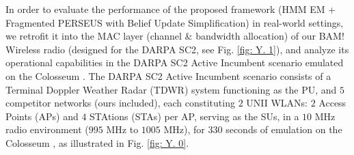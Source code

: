 \documentclass[12pt, draftcls, onecolumn]{IEEEtran}
\begin{document}
In order to evaluate the performance of the proposed framework (HMM EM + Fragmented PERSEUS with Belief Update Simplification) in real-world settings, we retrofit it into the MAC layer (channel \& bandwidth allocation) of our BAM! Wireless radio \cite{BAM} (designed for the DARPA SC2, see Fig. \ref{fig: Y. 1}), and analyze its operational capabilities in the DARPA SC2 Active Incumbent scenario \cite{DARPA:ActiveIncumbent} emulated on the Colosseum \cite{DARPA:SC2c2api, DARPA:SC2scenarios}. The DARPA SC2 Active Incumbent scenario consists of a Terminal Doppler Weather Radar (TDWR) system functioning as the PU, and $5$ competitor networks (ours included), each constituting $2$ UNII WLANs: $2$ Access Points (APs) and $4$ STAtions (STAs) per AP, serving as the SUs, in a $10$ MHz radio environment ($995$ MHz to $1005$ MHz), for $330$ seconds of emulation on the Colosseum \cite{DARPA:ActiveIncumbent}, as illustrated in Fig. \ref{fig: Y. 0}.
\end{document}
